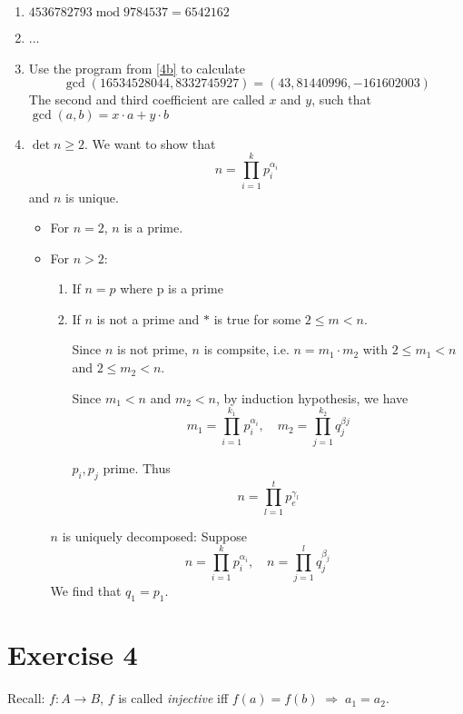 \documentclass[a4paper]{scrreprt}
\begin{document}
\begin{enumerate}[label=\alph*)]
    \item $4536782793\;\mathrm{mod}\;9784537=6542162$
    \item \label{4b} ...
    \item Use the program from \ref{4b} to calculate
        \[\gcd(16534528044, 8332745927)=(43, 81440996, -161602003)\]
        The second and third coefficient are called $x$ and $y$, such that
        $\gcd(a,b)=x\cdot a+y\cdot b$
    \item $\det n\geq 2$. We want to show that \[n=\prod_{i=1}^kp_i^{\alpha_i}\] and $n$ is unique.
        \begin{itemize}
            \item For $n=2$, $n$ is a prime.
            \item For $n > 2$:
                \begin{enumerate}[label=(\roman*)]
                    \item If $n=p$ where p is a prime
                    \item If $n$ is not a prime and $\ast$ is true for some $2\leq m<n$.

                        Since $n$ is not prime, $n$ is compsite, i.e. $n=m_1\cdot m_2$ with
                        $2\leq m_1<n$ and $2\leq m_2<n$.

                        Since $m_1 <n$ and $m_2<n$, by induction hypothesis, we have
                        \[m_1=\prod_{i=1}^{k_1}p_i^{\alpha_i},\quad
                            m_2=\prod_{j=1}^{k_2}q_j^{\beta j}\]

                        $p_i, p_j$ prime. Thus \[n=\prod_{l=1}^tp_e^{\gamma_l}\]
                \end{enumerate}

            $n$ is uniquely decomposed: Suppose\[n=\prod_{i=1}^kp_i^{\alpha_i},\quad
                n=\prod_{j=1}^lq_j^{\beta_j}\]
            We find that $q_1=p_1$.
        \end{itemize}
\end{enumerate}

\section*{Exercise 4}

Recall: $f:A\rightarrow B$, $f$ is called \textit{injective} iff $f(a)=f(b)\;\Rightarrow\; a_1=a_2$.
\end{document}
